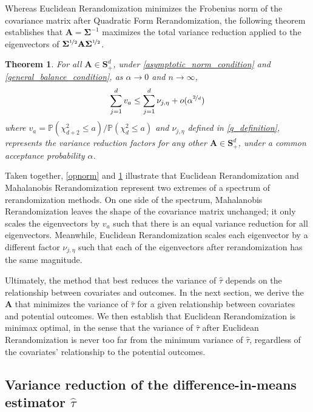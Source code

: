 \documentclass[11pt,twoside]{article}
\newtheorem{theorem}{Theorem}
\theoremstyle{definition}
\theoremstyle{remark}
\let\hat\widehat
\begin{document}
Whereas Euclidean Rerandomization minimizes the Frobenius norm of the covariance matrix after Quadratic Form Rerandomization, the following theorem establishes that $\mathbf{A} = \mathbf{\Sigma}^{-1}$ maximizes the total variance reduction applied to the eigenvectors of $\mathbf{\Sigma}^{\nicefrac{1}{2}} \mathbf{A} \mathbf{\Sigma}^{\nicefrac{1}{2}}$.
\begin{theorem} \label{totalvarredux}
    For all $\mathbf{A} \in \mathbf{S}^d_{+}$, under \cref{asymptotic_norm_condition} and \cref{general_balance_condition}, as $\alpha \to 0$ and $n \to \infty$,
    \begin{align*}
        \sum^d_{j=1} v_a \leq \sum^d_{j=1}  \nu_{j, \eta} + o(\alpha^{\nicefrac{2}{d}})
    \end{align*}
    where $v_a = \mathbb{P}(\chi^2_{d+2} \leq a) /\mathbb{P}(\chi^2_d \leq a)$ and $\nu_{j, \eta}$ defined in \cref{q_definition}, represents the variance reduction factors for any other $\mathbf{A} \in \mathbf{S}^{d}_{+}$, under a common acceptance probability $\alpha$.
\end{theorem}

Taken together, \cref{opnorm} and \cref{totalvarredux} illustrate that Euclidean Rerandomization and Mahalanobis Rerandomization represent two extremes of a spectrum of rerandomization methods. On one side of the spectrum, Mahalanobis Rerandomization leaves the shape of the covariance matrix unchanged; it only scales the eigenvectors by $v_a$ such that there is an equal variance reduction for all eigenvectors. Meanwhile, Euclidean Rerandomization scales each eigenvector by a different factor $\nu_{j, \eta}$ such that each of the eigenvectors after rerandomization has the same magnitude.

Ultimately, the method that best reduces the variance of $\widehat{\tau}$ depends on the relationship between covariates and outcomes. In the next section, we derive the $\mathbf{A}$ that minimizes the variance of $\widehat{\tau}$ for a given relationship between covariates and potential outcomes. We then establish that Euclidean Rerandomization is minimax optimal, in the sense that the variance of $\widehat{\tau}$ after Euclidean Rerandomization is never too far from the minimum variance of $\hat{\tau}$, regardless of the covariates' relationship to the potential outcomes. 

\subsection{Variance reduction of the difference-in-means estimator $\widehat{\tau}$} \label{var_reduction_section}
\end{document}
